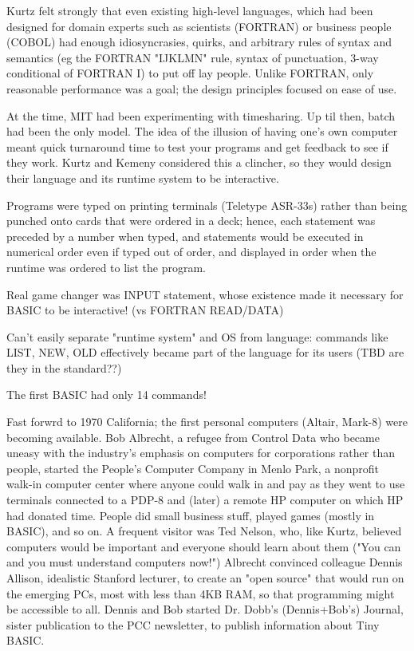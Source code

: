 \documentclass{article}
\begin{document}
Kurtz felt strongly that even existing high-level
languages, which had been designed for domain experts such as scientists
(FORTRAN) or business people (COBOL) 
had enough idiosyncrasies, quirks, and arbitrary rules of syntax and
semantics (eg the FORTRAN "IJKLMN" rule, syntax of punctuation, 3-way
conditional of FORTRAN I) to put off lay people.  Unlike FORTRAN,
only reasonable performance was a goal; the design principles focused on
ease of use.

At the time, MIT had been experimenting with timesharing.  Up til then,
batch had been the only model.  The idea of the illusion of having one's
own computer meant quick turnaround time to test your programs and get
feedback to see if they work.  Kurtz and Kemeny considered this a
clincher, so they would design their language and its runtime system to
be interactive.

Programs were typed on printing terminals (Teletype ASR-33s) rather than
being punched onto cards that were ordered in a deck; hence, each
statement was preceded by a number when typed, and statements would be
executed in numerical order even if typed out of order, and displayed in
order when the runtime was ordered to list the program.

Real game changer was INPUT statement, whose existence made it necessary
for BASIC to be interactive!  (vs FORTRAN READ/DATA)

Can't easily separate "runtime system" and OS from language: commands
like LIST, NEW, OLD effectively became part of the language for its
users (TBD are they in the standard??)

The first BASIC had only 14 commands!

Fast forwrd to 1970 California; the first personal computers (Altair,
Mark-8) were becoming available.  Bob Albrecht, a refugee from Control
Data who became uneasy with the industry's emphasis on computers for
corporations rather than people, 
started the People's Computer Company in Menlo Park, a nonprofit walk-in
computer center where anyone could walk in and pay as they went to use
terminals connected to a PDP-8 and (later) a remote HP computer on which
HP had donated time.  People did small business stuff, played games
(mostly in BASIC), and so on.
A frequent visitor was Ted Nelson, who, like Kurtz, believed computers
would be important and everyone should learn about them ("You can and
you must understand computers now!")
Albrecht convinced colleague Dennis Allison,
idealistic Stanford lecturer, to create an "open source"  that
would run on the emerging PCs, most with less than 4KB RAM, so that
programming might be accessible to all.  Dennis and
Bob started Dr. Dobb's (Dennis+Bob's) Journal, sister publication to the
PCC newsletter, to publish information about Tiny BASIC.
\end{document}
